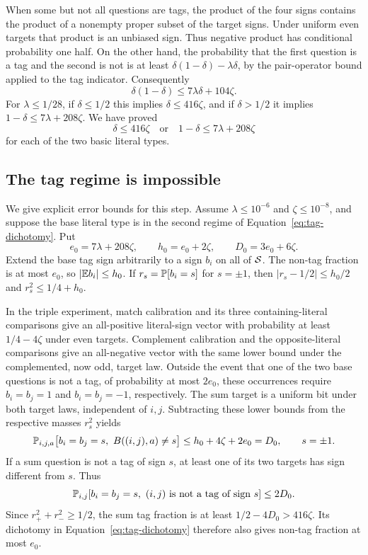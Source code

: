 When some but not all questions are tags, the product of the four
signs contains the product of a nonempty proper subset of the target
signs. Under uniform even targets that product is an unbiased sign.
Thus negative product has conditional probability one half.
On the other hand, the probability that the first question is a tag
and the second is not is at least
$\delta(1-\delta)-\lambda\delta$, by the pair-operator bound applied
to the tag indicator. Consequently
\[
 \delta(1-\delta)\leq7\lambda\delta+104\zeta.
\]
For $\lambda\leq1/28$, if $\delta\leq1/2$ this implies
$\delta\leq416\zeta$, and if $\delta>1/2$ it implies
$1-\delta\leq7\lambda+208\zeta$. We have proved
\begin{equation}\label{eq:tag-dichotomy}
 \delta\leq416\zeta
 \quad\text{or}\quad
 1-\delta\leq7\lambda+208\zeta
\end{equation}
for each of the two basic literal types.

\subsection{The tag regime is impossible}

We give explicit error bounds for this step. Assume
$\lambda\leq10^{-6}$ and $\zeta\leq10^{-8}$, and suppose the base
literal type is in the second regime of
Equation~\ref{eq:tag-dichotomy}. Put
\[
 e_0=7\lambda+208\zeta,\qquad
 h_0=e_0+2\zeta,\qquad D_0=3e_0+6\zeta.
\]
Extend the base tag sign arbitrarily to a sign $b_i$ on all of
$\mathcal S$. The non-tag fraction is at most $e_0$, so
$|\mathbb E b_i|\leq h_0$. If $r_s=\mathbb P[b_i=s]$ for $s=\pm1$, then
$|r_s-1/2|\leq h_0/2$ and $r_s^2\leq1/4+h_0$.

In the triple experiment, match calibration and its three
containing-literal comparisons give an all-positive literal-sign
vector with probability at least $1/4-4\zeta$ under even targets.
Complement calibration and the opposite-literal comparisons give
an all-negative vector with the same lower bound under the
complemented, now odd, target law. Outside the event that one of
the two base questions is not a tag, of probability at most $2e_0$,
these occurrences require $b_i=b_j=1$ and $b_i=b_j=-1$,
respectively.
The sum target is a uniform bit under both target laws, independent
of $i,j$. Subtracting these lower bounds from the respective masses
$r_s^2$ yields
\begin{equation}\label{eq:same-class-sum-error}
 \mathbb P_{i,j,a}\bigl[b_i=b_j=s,\ B((i,j),a)\ne s\bigr]
 \leq h_0+4\zeta+2e_0=D_0,
 \qquad s=\pm1.
\end{equation}
If a sum question is not a tag of sign $s$, at least one of its two
targets has sign different from $s$. Thus
\[
 \mathbb P_{i,j}[b_i=b_j=s,\ (i,j)\text{ is not a tag of sign }s]
 \leq2D_0.
\]
Since $r_+^2+r_-^2\geq1/2$, the sum tag fraction is at least
$1/2-4D_0>416\zeta$. Its dichotomy in
Equation~\ref{eq:tag-dichotomy} therefore also gives non-tag
fraction at most $e_0$.

